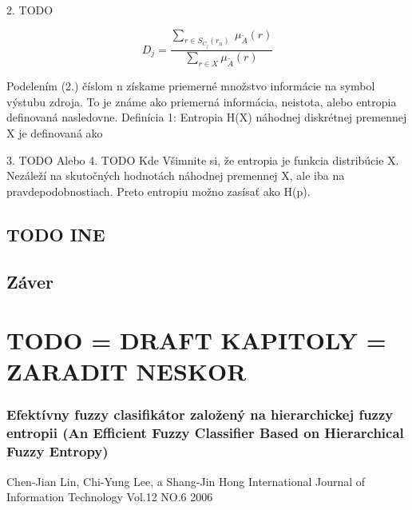 2. TODO 

\begin{equation}\label{fuzzy}
D_j = \frac{ \sum\limits_{r \in S_{C_{j}}(r_n)  } \: \mu_{\tilde{A}} (r) }{\sum\limits_{r \in X  } \mu_{\tilde{A}} (r) }
\end{equation}




Podelením (2.) číslom n získame priemerné množstvo informácie na symbol výstubu zdroja. To je známe ako priemerná informácia, neistota, alebo entropia definovaná nasledovne.
Definícia 1:  Entropia H(X) náhodnej diskrétnej premennej X je definovaná ako 

3. TODO
Alebo
4.	TODO
Kde
Všimnite si, že entropia je funkcia distribúcie X. Nezáleží na skutočných hodnotách náhodnej premennej X, ale iba na pravdepodobnostiach. Preto entropiu možno zasísať ako H(p).


\section{TODO INE }

\section{Záver}



































\chapter*{TODO = DRAFT KAPITOLY = ZARADIT NESKOR}
\subsection{Efektívny fuzzy clasifikátor založený na hierarchickej fuzzy entropii (An Efficient Fuzzy Classifier Based on Hierarchical Fuzzy Entropy)}
Chen-Jian Lin, Chi-Yung Lee, a Shang-Jin Hong
International Journal of Information Technology
Vol.12 NO.6 2006


